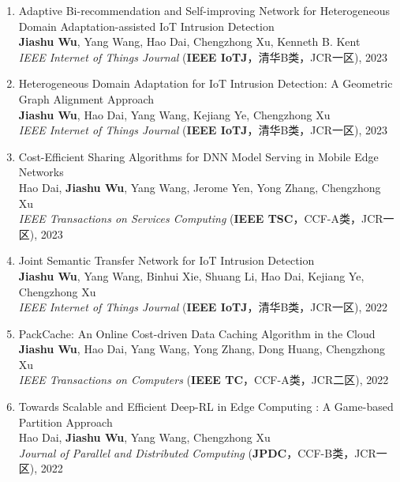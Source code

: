 \documentclass[letterpaper,11pt]{article}
\newcommand{\RNum}[1]{\uppercase\expandafter{\romannumeral #1\relax}}
\begin{document}
\begin{enumerate}
  \item Adaptive Bi-recommendation and Self-improving Network for Heterogeneous Domain Adaptation-assisted IoT Intrusion Detection\\
  \textbf{Jiashu Wu}, Yang Wang\textsuperscript{\Letter}, Hao Dai, Chengzhong Xu, Kenneth B. Kent\\
  \textit{IEEE Internet of Things Journal} (\textbf{IEEE IoTJ}，清华B类，JCR一区), 2023

  \item Heterogeneous Domain Adaptation for IoT Intrusion Detection: A Geometric Graph Alignment Approach\\
  \textbf{Jiashu Wu}, Hao Dai, Yang Wang\textsuperscript{\Letter}, Kejiang Ye, Chengzhong Xu\\
  \textit{IEEE Internet of Things Journal} (\textbf{IEEE IoTJ}，清华B类，JCR一区), 2023

  \item Cost-Efficient Sharing Algorithms for DNN Model Serving in Mobile Edge Networks\\
  Hao Dai, \textbf{Jiashu Wu}, Yang Wang\textsuperscript{\Letter}, Jerome Yen, Yong Zhang, Chengzhong Xu\\
  \textit{IEEE Transactions on Services Computing} (\textbf{IEEE TSC}，CCF-A类，JCR一区), 2023

  \item Joint Semantic Transfer Network for IoT Intrusion Detection\\
  \textbf{Jiashu Wu}, Yang Wang\textsuperscript{\Letter}, Binhui Xie, Shuang Li, Hao Dai, Kejiang Ye, Chengzhong Xu\\
  \textit{IEEE Internet of Things Journal} (\textbf{IEEE IoTJ}，清华B类，JCR一区), 2022

  \item PackCache: An Online Cost-driven Data Caching Algorithm in the Cloud\\
  \textbf{Jiashu Wu}, Hao Dai, Yang Wang\textsuperscript{\Letter}, Yong Zhang, Dong Huang, Chengzhong Xu\\
  \textit{IEEE Transactions on Computers} (\textbf{IEEE TC}，CCF-A类，JCR二区), 2022

  \item Towards Scalable and Efficient Deep-RL in Edge Computing : A Game-based Partition Approach\\
  Hao Dai, \textbf{Jiashu Wu}, Yang Wang\textsuperscript{\Letter}, Chengzhong Xu\\
  \textit{Journal of Parallel and Distributed Computing} (\textbf{JPDC}，CCF-B类，JCR一区), 2022


\end{enumerate}
\end{document}
